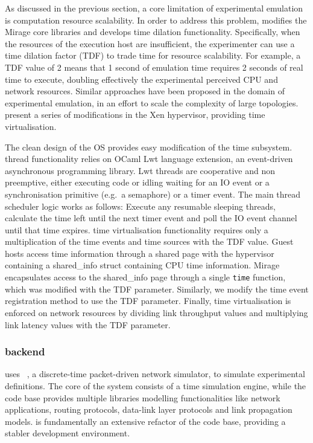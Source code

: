 As discussed in the previous section, a core limitation of experimental
emulation is computation resource scalability. In order to address this problem,  
\sdnsim modifies the Mirage core libraries and develops time
dilation functionality.  Specifically, when the resources of the execution host
are insufficient, the experimenter can use a time dilation factor (TDF) to trade
time for resource scalability. For example, a TDF value of 2 means that 1 second
of emulation time requires 2 seconds of real time to execute, doubling
effectively the experimental perceived CPU and network resources. Similar
approaches have been proposed in the domain of experimental emulation, in an
effort to scale the complexity of large topologies.   present a
series of modifications in the Xen hypervisor, providing time virtualisation.

The clean design of the \mirage OS provides easy modification of the time
subsystem. \mirage thread functionality relies on OCaml Lwt language extension,
an event-driven asynchronous programming library.  Lwt threads are cooperative
and non preemptive, either executing code or idling waiting for an IO event or a
synchronisation primitive (e.g.~a semaphore) or a timer event. The main thread
scheduler logic works as follows: Execute any resumable sleeping threads,
calculate the time left until the next timer event and poll the IO event channel
until that time expires. \sdnsim time virtualisation functionality requires only
a multiplication of the time events and time sources with the TDF value.  Guest
hosts access time information through a shared page with the hypervisor
containing a shared\_info struct containing CPU time information. Mirage
encapsulates access to the shared\_info page through a single \texttt{time}
function, which was modified with the TDF parameter. Similarly, we modify the
time event registration method to use the TDF parameter. Finally, time
virtualisation is enforced on network resources by dividing link throughput
values and multiplying link latency values with the TDF parameter. 

\subsubsection{ backend}

\sdnsim uses ~, a discrete-time packet-driven network
simulator, to simulate experimental definitions. The core of the system consists
of a time simulation engine, while the code base provides multiple libraries
modelling functionalities like network applications, routing protocols,
data-link layer protocols and link propagation models.  is fundamentally
an extensive refactor of the  code base, providing a stabler development
environment. 

